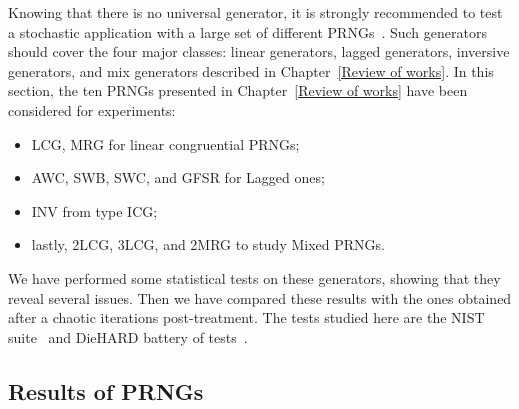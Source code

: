 Knowing that there is no universal generator, it is strongly recommended to test a stochastic application with a large set of different PRNGs~\cite{DavidRC2003643}. Such generators should cover the four major classes: linear generators, lagged generators, inversive generators, and mix generators described in Chapter~\ref{Review of works}. In this section, the ten PRNGs presented in Chapter~\ref{Review of works} have been considered for experiments:
\begin{itemize}
\item LCG, MRG for linear congruential PRNGs; 
\item AWC, SWB, SWC, and GFSR for Lagged ones;
\item INV from type ICG;
\item lastly, 2LCG, 3LCG, and 2MRG to study Mixed PRNGs. 
\end{itemize}
We have performed some statistical tests on these generators, showing that 
they reveal several issues. Then we have compared these results with 
the ones obtained after a chaotic iterations post-treatment.
The tests studied here are the NIST suite~\cite{ANDREW2008} and DieHARD battery of tests~\cite{Marsaglia1996}.

\subsection{Results of PRNGs}
\label{Results and discussion}

